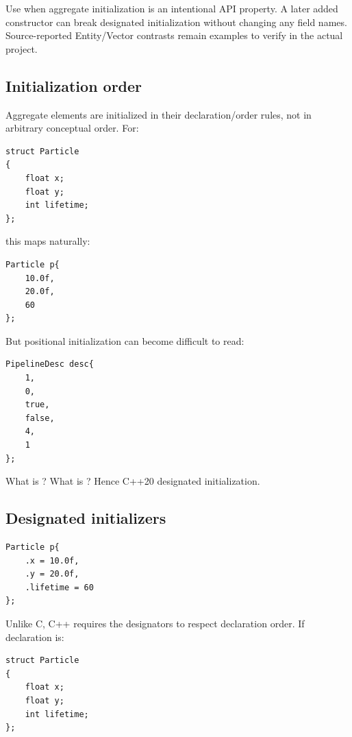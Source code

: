 Use  when aggregate initialization is an intentional API property. A later added constructor can break designated initialization without changing any field names. Source-reported Entity/Vector contrasts remain examples to verify in the actual project.

\subsection{Initialization order}\label{01-foundations-i-ch003-initialization-order}

\hypertarget{01-foundations-i-ch003-initialization-order}{}

Aggregate elements are initialized in their declaration/order rules, not in arbitrary conceptual order. For:

\begin{verbatim}
struct Particle
{
    float x;
    float y;
    int lifetime;
};
\end{verbatim}

this maps naturally:

\begin{verbatim}
Particle p{
    10.0f,
    20.0f,
    60
};
\end{verbatim}

But positional initialization can become difficult to read:

\begin{verbatim}
PipelineDesc desc{
    1,
    0,
    true,
    false,
    4,
    1
};
\end{verbatim}

What is ? What is ? Hence C++20 designated initialization.

\subsection{Designated initializers}\label{01-foundations-i-ch003-designated-initializers}

\hypertarget{01-foundations-i-ch003-designated-initializers}{}

\begin{verbatim}
Particle p{
    .x = 10.0f,
    .y = 20.0f,
    .lifetime = 60
};
\end{verbatim}

Unlike C, C++ requires the designators to respect declaration order. If declaration is:

\begin{verbatim}
struct Particle
{
    float x;
    float y;
    int lifetime;
};
\end{verbatim}

